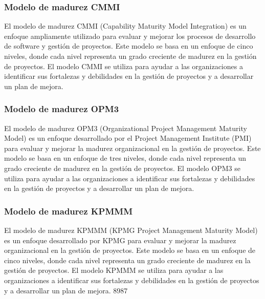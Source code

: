 \subsubsection{Modelo de madurez CMMI}
El modelo de madurez CMMI (Capability Maturity Model Integration) es un enfoque ampliamente utilizado para evaluar y mejorar los procesos de desarrollo de software y gestión de proyectos. Este modelo se basa en un enfoque de cinco niveles, donde cada nivel representa un grado creciente de madurez en la gestión de proyectos. El modelo CMMI se utiliza para ayudar a las organizaciones a identificar sus fortalezas y debilidades en la gestión de proyectos y a desarrollar un plan de mejora.
\subsubsection{Modelo de madurez OPM3}
El modelo de madurez OPM3 (Organizational Project Management Maturity Model) es un enfoque desarrollado por el Project Management Institute (PMI) para evaluar y mejorar la madurez organizacional en la gestión de proyectos. Este modelo se basa en un enfoque de tres niveles, donde cada nivel representa un grado creciente de madurez en la gestión de proyectos. El modelo OPM3 se utiliza para ayudar a las organizaciones a identificar sus fortalezas y debilidades en la gestión de proyectos y a desarrollar un plan de mejora.
\subsubsection{Modelo de madurez KPMMM}
El modelo de madurez KPMMM (KPMG Project Management Maturity Model) es un enfoque desarrollado por KPMG para evaluar y mejorar la madurez organizacional en la gestión de proyectos. Este modelo se basa en un enfoque de cinco niveles, donde cada nivel representa un grado creciente de madurez en la gestión de proyectos. El modelo KPMMM se utiliza para ayudar a las organizaciones a identificar sus fortalezas y debilidades en la gestión de proyectos y a desarrollar un plan de mejora.
 8987